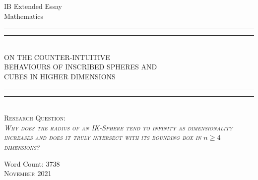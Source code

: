 \begin{titlepage}

    \centering
    \vfill
    
    \large{IB Extended Essay}\\
    \large{Mathematics}\\
    
    \rule{\textwidth}{1.6pt}\vspace*{-\baselineskip}\vspace*{3.2pt}
    \rule{\textwidth}{0.4pt}\\[0.2\baselineskip]
    
    {\LARGE ON THE COUNTER-INTUITIVE\\[0.3\baselineskip] BEHAVIOURS OF INSCRIBED SPHERES AND \\[0.5\baselineskip] CUBES IN HIGHER DIMENSIONS}\\[0.2\baselineskip]
    
    
    
    \rule{\textwidth}{0.4pt}\vspace*{-\baselineskip}\vspace*{4pt}
    \rule{\textwidth}{1.6pt}\\[\baselineskip]
    \scshape
    \vfill
    Research Question:\\
    \textit{Why  does  the  radius  of  an  IK-Sphere  tend  to  infinity  as  dimensionality increases and does it truly intersect with its bounding box in $n \geq 4$ dimensions?}
    \par
    \vfill
    
    \small{Word Count: 3738} \\
    \vspace*{2\baselineskip}
    {\scshape November 2021} \\
  \end{titlepage}